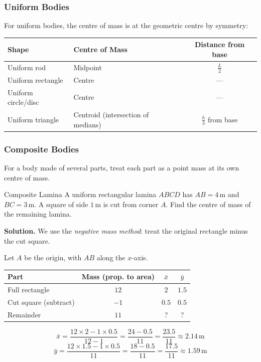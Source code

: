 \documentclass[12pt, a4paper]{book}
\newcommand{\m}{\,\mathrm{m}}
\begin{document}
\subsubsection{Uniform Bodies}
For uniform bodies, the centre of mass is at the geometric centre by symmetry:

\begin{center}
\begin{tabular}{llc}
\toprule
Shape & Centre of Mass & Distance from base \\
\midrule
Uniform rod & Midpoint & $\frac{L}{2}$ \\
Uniform rectangle & Centre & --- \\
Uniform circle/disc & Centre & --- \\
Uniform triangle & Centroid (intersection of medians) & $\frac{h}{3}$ from base \\
\bottomrule
\end{tabular}
\end{center}

\subsubsection{Composite Bodies}

For a body made of several parts, treat each part as a point mass at its own centre of mass.

\begin{exmp}{Composite Lamina}{}
A uniform rectangular lamina $ABCD$ has $AB = 4\m$ and $BC = 3\m$. A square of side $1\m$ is cut from corner $A$. Find the centre of mass of the remaining lamina.

\medskip
\textbf{Solution.} We use the \emph{negative mass method}: treat the original rectangle minus the cut square.

Let $A$ be the origin, with $AB$ along the $x$-axis.

\begin{center}
\begin{tabular}{lccc}
\toprule
Part & Mass (prop. to area) & $\bar{x}$ & $\bar{y}$ \\
\midrule
Full rectangle & $12$ & $2$ & $1.5$ \\
Cut square (subtract) & $-1$ & $0.5$ & $0.5$ \\
\midrule
Remainder & $11$ & ? & ? \\
\bottomrule
\end{tabular}
\end{center}

\[
  \bar{x} = \frac{12 \times 2 - 1 \times 0.5}{12 - 1} = \frac{24 - 0.5}{11} = \frac{23.5}{11} \approx 2.14\m
\]
\[
  \bar{y} = \frac{12 \times 1.5 - 1 \times 0.5}{11} = \frac{18 - 0.5}{11} = \frac{17.5}{11} \approx 1.59\m
\]
\end{exmp}
\end{document}
